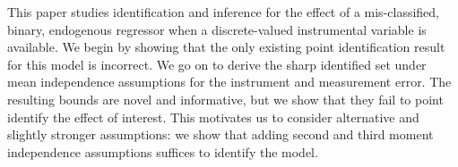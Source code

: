 This paper studies identification and inference for the effect of a mis-classified, binary, endogenous regressor when a discrete-valued instrumental variable is available. 
We begin by showing that the only existing point identification result for this model is incorrect. 
We go on to derive the sharp identified set under mean independence assumptions for the instrument and measurement error.
The resulting bounds are novel and informative, but we show that they fail to point identify the effect of interest.
This motivates us to consider alternative and slightly stronger assumptions: we show that adding second and third moment independence assumptions suffices to identify the model.
